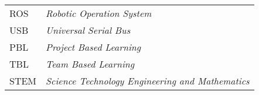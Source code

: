 \begin{thesisabbreviations}
\begin{footnotesize}
\begin{longtable}[l]{p{2cm}l}

  ROS       \dotfill &  \textit{Robotic Operation System} \\
  USB		\dotfill &  \textit{Universal Serial Bus} \\
  PBL		\dotfill &  \textit{Project Based Learning} \\
  TBL		\dotfill &  \textit{Team Based Learning} \\
  STEM		\dotfill &  \textit{Science Technology Engineering and Mathematics} \\
\end{longtable}
\end{footnotesize}
\end{thesisabbreviations}
